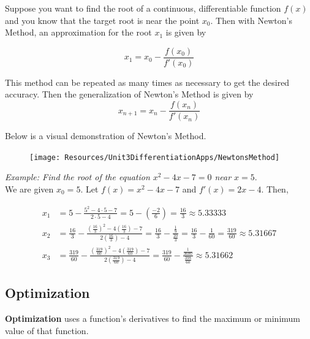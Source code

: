         \noindent Suppose you want to find the root of a continuous, differentiable function $f(x)$ and you
        know that the target root is near the point $x_0$. Then with Newton's Method, an approximation
        for the root $x_1$ is given by

        \begin{equation*}
            x_1 = x_0 - \frac{f(x_0)}{f'(x_0)}
        \end{equation*}

        \noindent This method can be repeated as many times as necessary to get the desired accuracy.
        Then the generalization of Newton's Method is given by \\

        \begin{equation*}
            x_{n+1}     = x_n - \frac{f(x_n)}{f'(x_n)}
        \end{equation*}

        \noindent Below is a visual demonstration of Newton's Method.

        \begin{figure}
            \centering
            \texttt{[image: Resources/Unit3DifferentiationApps/NewtonsMethod]}
        \end{figure}

        \noindent \color{blue} \textit{Example: Find the root of the equation $x^2-4x-7=0$ near
        $x=5$}. \color{black} \\

        \noindent We are given $x_0=5$. Let $f(x)=x^2-4x-7$ and $f'(x)=2x-4$. Then,

        \begin{align*}
            x_1 &= 5 - \frac{5^2-4\cdot5-7}{2\cdot5-4} = 5-\left(\frac{-2}{6}\right)=\frac{16}{3}
            \approx 5.33333 \\
            x_2 &= \frac{16}{3} - \frac{\left(\frac{16}{3}\right)^2-4\left(\frac{16}{3}\right)-7}
            {2\left(\frac{16}{3}\right)-4} = \frac{16}{3}-\frac{\frac{1}{9}}{\frac{20}{3}}
            = \frac{16}{3} - \frac{1}{60} = \frac{319}{60} \approx 5.31667 \\
            x_3 &= \frac{319}{60} - \frac{\left(\frac{319}{60}\right)^2-4\left(\frac{319}{60}\right)-7}
            {2\left(\frac{319}{60}\right)-4} = \frac{319}{60} -
            \frac{\frac{1}{3600}}{\frac{398}{60}} \approx 5.31662
        \end{align*}


    \subsection{Optimization}
        \textbf{Optimization} uses a function's derivatives to find the maximum or
        minimum value of that function. \\

